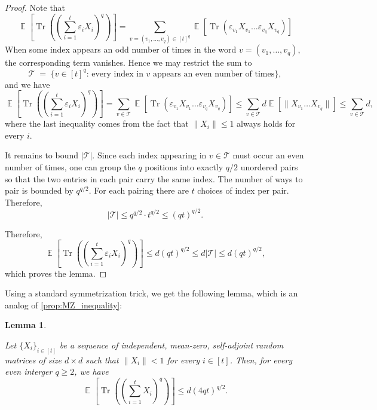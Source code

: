 \documentclass[10pt,a4paper]{article}
\newtheorem{lemma}[theorem]{Lemma}
\DeclareMathOperator*{\E}{\mathbb{E}}
\DeclareMathOperator*{\Tr}{Tr}
\newcommand{\eps}{\varepsilon}
\newcommand{\1}{\mathbbm{1}}
\newcommand{\tuple}[1]{\left(#1\right)}
\newcommand{\Ex}[2][]{\E_{#1}\left[#2\right]}
\begin{document}
\begin{proof}
Note that \[
    \Ex{\Tr \tuple{\tuple{\sum_{i=1}^t \eps_i X_i}^q}} = \sum_{v=(v_1,\dots,v_q)\in[t]^{q}} \Ex{\Tr( \eps_{v_1} X_{v_1}\dots \eps_{v_q} X_{v_q})}
\]
When some index appears an odd number of times in the word
$v=(v_1,\dots,v_q)$, the corresponding term vanishes.
Hence we may restrict the sum to
\[
    \mathcal{T}
    \;=\;
    \bigl\{v\in[t]^{q}:\,
          \text{every index in $v$ appears an even number of times}\bigr\},
\]
and we have \[
\Ex{\Tr \tuple{\tuple{\sum_{i=1}^t \eps_i X_i}^q}} = \sum_{v\in \mathcal{T}} \Ex{\Tr(\eps_{v_1}X_{v_1}\dots \eps_{v_q}X_{v_q})} \le \sum_{v\in \mathcal{T}} d \Ex{\|X_{v_1}\dots X_{v_q}\|} \le \sum_{v\in \mathcal{T}} d,
\]
where the last inequality comes from the fact that $\|X_i\| \le 1$ always holds for every $i$.

%
%
%
%
%


It remains to bound $|\mathcal{T}|$.
Since each index appearing in $v\in\mathcal{T}$ must occur an even number of times, one can group the $q$ positions into exactly $q/2$ unordered pairs so that the two entries in each pair carry the same index.
The number of ways to pair is bounded by $q^{q/2}$.
For each pairing there are $t$ choices of index per pair. Therefore,
\[
    |\mathcal{T}| \le q^{q/2} \cdot t^{q/2} \le (qt)^{q/2} .
\]

Therefore,
\[
    \Ex{\Tr \tuple{\tuple{\sum_{i=1}^t \eps_i X_i}^q}} \le d (qt)^{q / 2} \le
    d |\mathcal{T}|
   \le
    d(qt)^{q/2},
\]
which proves the lemma.
\end{proof}

Using a standard symmetrization trick, we get the following lemma, which is an analog of \cref{prop:MZ_inequality}:
\begin{lemma}\label{lem:trace_moment_no_rad}

Let $\{X_i\}_{i \in [t]}$ be a sequence of independent, mean-zero, self-adjoint random matrices of size $d \times d$ such that $\|X_i\| < 1$ for every $i \in [t]$. Then, for every even interger $q \ge 2$, we have
\[
 \Ex{\Tr \tuple{\tuple{\sum_{i=1}^t X_i}^q}}
    \le 
   d \left(4 q t\right)^{q/2} .
\]
\end{lemma}
\end{document}
